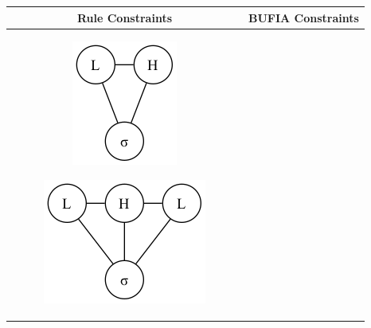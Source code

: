 \documentclass[11pt,letterpaper]{article}
\begin{document}
\begin{table}[H] 
	\centering
	\begin{tabular}{c|c}
		\hline
		Rule Constraints & BUFIA Constraints\\
		\hline
		\begin{subfigure}{0.13\columnwidth}
			\includegraphics[width=\textwidth]{hausacons/cons0}
			\caption{}
			\label{cons1a}
		\end{subfigure}
		\begin{subfigure}{0.2\columnwidth}
			\includegraphics[width=\textwidth]{graph/LHL1}

\end{subfigure}
\end{tabular}
\end{table}
\end{document}
